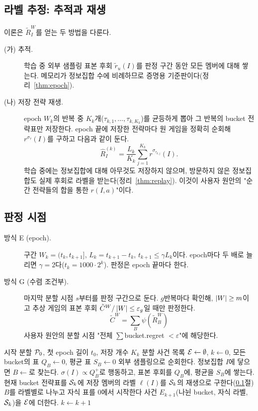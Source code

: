 \subsection{라벨 추정: 추적과 재생}\label{sec:estimate}
이론은 $\tilde R_I^W$를 얻는 두 방법을 다룬다.
\begin{description}
  \item[(가) 추적.] 학습 중 외부 샘플링 표본 후회 $\tilde r_u(I)$를 판정 구간 동안 모든 멤버에 대해 쌓는다. 메모리가 정보집합 수에 비례하므로 증명용 기준판이다(정리~\ref{thm:epoch}).
  \item[(나) 저장 전략 재생.] epoch $W_k$의 반복 중 $K_k$개($\tau_{k,1},\dots,\tau_{k,K_k}$)를 균등하게 뽑아 그 반복의 bucket 전략표만 저장한다.
    epoch 끝에 저장한 전략마다 원 게임을 정확히 순회해 $r^{\sigma_{\tau}}(I)$를 구하고 다음과 같이 둔다.
    \[
    \hat R_I^{(k)}=\frac{L_k}{K_k}\sum_{j=1}^{K_k}r^{\sigma_{\tau_{k,j}}}(I).
    \]
    학습 중에는 정보집합에 대해 아무것도 저장하지 않으며, 방문하지 않은 정보집합도 실제 후회로 라벨을 받는다(정리~\ref{thm:replay}).
    이것이 사용자 원안의 "순간 전략들의 합을 통한 $r(I,a)$"이다.
\end{description}

\subsection{판정 시점}\label{sec:schedule}
\begin{description}
  \item[방식 E (epoch).] 구간 $W_k=(t_k,t_{k+1}]$, $L_k=t_{k+1}-t_k$, $t_{k+1}\le\gamma L_k$이다. epoch마다 두 배로 늘리면 $\gamma=2$다($t_k=1000\cdot2^k$). 판정은 epoch 끝마다 한다.
  \item[방식 G (수렴 조건부).] 마지막 분할 시점 $s$부터를 판정 구간으로 둔다. $g$반복마다 확인해, $\left\lvert W\right\rvert\ge m$이고 추상 게임의 표본 후회 $\tilde C^W/\left\lvert W\right\rvert\le\varepsilon_g$일 때만 판정한다.
    \[
    \tilde C^W=\sum_B\psi(\tilde R_B^W)
    \]
    사용자 원안의 분할 시점 "전체 $\sum$bucket.regret $<\varepsilon$"에 해당한다.
\end{description}

\begin{algorithm}[t]
\caption{순수 ASWISS (방식 E, 재생 라벨)}\label{alg:aswiss}
\begin{algorithmic}[1]
\Require 시작 분할 $\mathcal{P}_0$, 첫 epoch 길이 $t_0$, 저장 개수 $K_k$
\State 분할 사건 목록 $\mathcal{E}\gets\emptyset$, $k\gets0$, 모든 bucket의 표 $Q_B\gets0$, 평균 표 $S_B\gets0$
    \State 외부 샘플링으로 순회한다. 정보집합 $I$에 닿으면 $B\gets$로 찾는다.
    \State $\sigma(I)\propto Q_B^+$로 행동하고, 표본 후회를 $Q_B$에, 평균을 $S_B$에 쌓는다.
  \EndFor
   현재 bucket 전략표를 $\mathcal{S}_k$에 저장 \EndIf
      \State 멤버의 라벨 $\ell(I)$를 $\mathcal{S}_k$의 재생으로 구한다(\ref{sec:estimate}절)
       $B$를 라벨별로 나누고 자식 표를 0에서 시작한다 \EndIf
    \EndFor
    \State 사건 $E_{k+1}$(나뉜 bucket, 자식 라벨, $\mathcal{S}_k$)을 $\mathcal{E}$에 더한다. $k\gets k+1$
  \EndIf
\EndFor
\end{algorithmic}
\end{algorithm}

